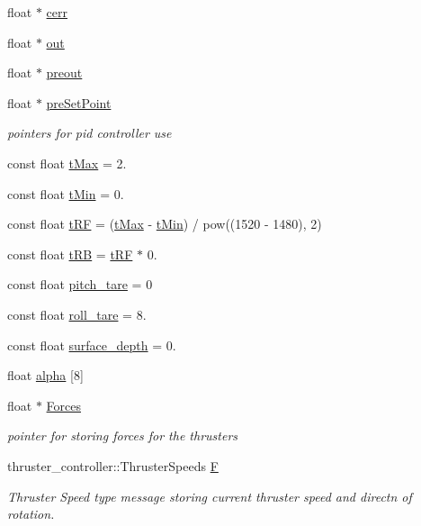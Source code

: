 \begin{DoxyCompactItemize}
float $\ast$ \hyperlink{classControl_a5b9e1402c27f26e5cc84d1e17a2d83b7}{cerr}
\item 
float $\ast$ \hyperlink{classControl_a7aae00ff04e44453c56e0b4c500f902c}{out}
\item 
float $\ast$ \hyperlink{classControl_a68319ff62b7b0a0f2034e6daf6a79aa3}{preout}
\item 
float $\ast$ \hyperlink{classControl_a94f3484d88729c31dfd74b983f7fab0d}{pre\+Set\+Point}
\begin{DoxyCompactList}\small\item\em pointers for pid controller use \end{DoxyCompactList}\item 
const float \hyperlink{classControl_aa0dfe0af55adef6ba02ba98cd538de6f}{t\+Max} = 2.
\item 
const float \hyperlink{classControl_a7cccef9b9893cbc515c85be334d34108}{t\+Min} = 0.
\item 
const float \hyperlink{classControl_acc43d71e4a89ff753f7d12f7fa562f7f}{t\+RF} = (\hyperlink{classControl_aa0dfe0af55adef6ba02ba98cd538de6f}{t\+Max} -\/ \hyperlink{classControl_a7cccef9b9893cbc515c85be334d34108}{t\+Min}) / pow((1520 -\/ 1480), 2)
\item 
const float \hyperlink{classControl_a5a5a86dff393624defa3747d2e2a39b3}{t\+RB} = \hyperlink{classControl_acc43d71e4a89ff753f7d12f7fa562f7f}{t\+RF} $\ast$ 0.
\item 
const float \hyperlink{classControl_a918db5567eafcc94052d8f41f94f462e}{pitch\+\_\+tare} = 0
\item 
const float \hyperlink{classControl_ae5285f73379bd5cbc060d99983de2c82}{roll\+\_\+tare} = 8.
\item 
const float \hyperlink{classControl_aea3797b8e27792b1d7887b92da69486e}{surface\+\_\+depth} = 0.
\item 
float \hyperlink{classControl_a9d9f9a31c555e320a948d062f7435edf}{alpha} \mbox{[}8\mbox{]}
\item 
float $\ast$ \hyperlink{classControl_a9d6bd0b67c1a539e3427a6bc87c71939}{Forces}
\begin{DoxyCompactList}\small\item\em pointer for storing forces for the thrusters \end{DoxyCompactList}\item 
thruster\+\_\+controller\+::\+Thruster\+Speeds \hyperlink{classControl_a812e1016b531c2efae35d17b03ec34eb}{F}
\begin{DoxyCompactList}\small\item\em Thruster Speed type message storing current thruster speed and directn of rotation. \end{DoxyCompactList}\item 

\end{DoxyCompactItemize}
